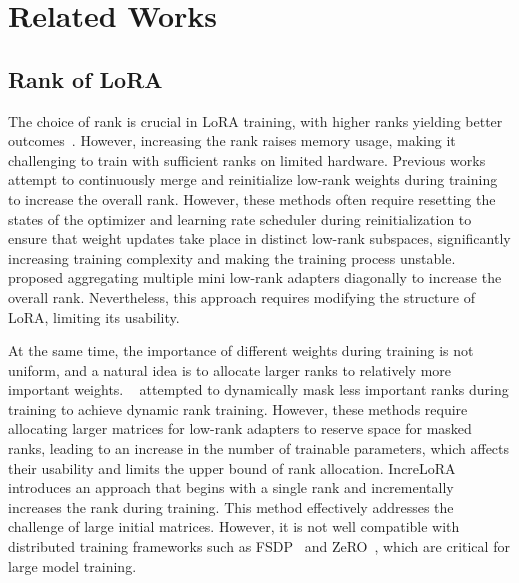 \section{Related Works}

\subsection{Rank of LoRA}
The choice of rank is crucial in LoRA training, with higher ranks yielding better outcomes~\citep{kalajdzievski2023rslora}. However, increasing the rank raises memory usage, making it challenging to train with sufficient ranks on limited hardware. Previous works~\citep{meng2024periodiclora, lialin2023relora} attempt to continuously merge and reinitialize low-rank weights during training to increase the overall rank. However, these methods often require resetting the states of the optimizer and learning rate scheduler during reinitialization to ensure that weight updates take place in distinct low-rank subspaces, significantly increasing training complexity and making the training process unstable. ~\citet{ren2024melora} proposed aggregating multiple mini low-rank adapters diagonally to increase the overall rank. Nevertheless, this approach requires modifying the structure of LoRA, limiting its usability.

At the same time, the importance of different weights during training is not uniform, and a natural idea is to allocate larger ranks to relatively more important weights. ~\citet{zhang2023adalora, hu2023salora} attempted to dynamically mask less important ranks during training to achieve dynamic rank training. However, these methods require allocating larger matrices for low-rank adapters to reserve space for masked ranks, leading to an increase in the number of trainable parameters, which affects their usability and limits the upper bound of rank allocation. IncreLoRA~\citep{zhang2023increlora} introduces an approach that begins with a single rank and incrementally increases the rank during training. This method effectively addresses the challenge of large initial matrices. However, it is not well compatible with distributed training frameworks such as FSDP~\citep{zhao2023pytorch} and ZeRO~\citep{rajbhandari2020zero}, which are critical for large model training.

